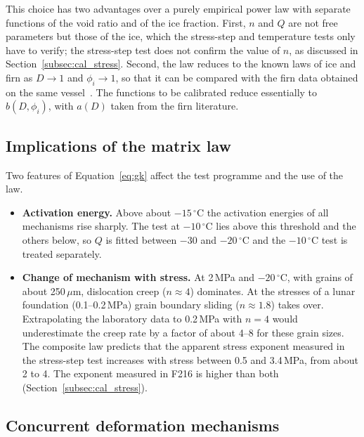 This choice has two advantages over a purely empirical power law with separate functions of the void ratio and of the ice fraction. First, $n$ and $Q$ are not free parameters but those of the ice, which the stress-step and temperature tests only have to verify; the stress-step test does not confirm the value of $n$, as discussed in Section~\ref{subsec:cal_stress}. Second, the law reduces to the known laws of ice and firn as $D\to1$ and $\phi_i\to1$, so that it can be compared with the firn data obtained on the same vessel~\cite{skarbek2025data}. The functions to be calibrated reduce essentially to $b(D,\phi_i)$, with $a(D)$ taken from the firn literature.

\subsection{Implications of the matrix law}

Two features of Equation~\eqref{eq:gk} affect the test programme and the use of the law.
\begin{itemize}
    \item \textbf{Activation energy.} Above about $-15\,^\circ$C the activation energies of all mechanisms rise sharply. The test at $-10\,^\circ$C lies above this threshold and the others below, so $Q$ is fitted between $-30$ and $-20\,^\circ$C and the $-10\,^\circ$C test is treated separately.
    \item \textbf{Change of mechanism with stress.} At 2\,MPa and $-20\,^\circ$C, with grains of about 250\,$\mu$m, dislocation creep ($n\approx4$) dominates. At the stresses of a lunar foundation (0.1--0.2\,MPa) grain boundary sliding ($n\approx1.8$) takes over. Extrapolating the laboratory data to 0.2\,MPa with $n = 4$ would underestimate the creep rate by a factor of about 4--8 for these grain sizes. The composite law predicts that the apparent stress exponent measured in the stress-step test increases with stress between 0.5 and 3.4\,MPa, from about 2 to 4. The exponent measured in F216 is higher than both (Section~\ref{subsec:cal_stress}).
\end{itemize}

\subsection{Concurrent deformation mechanisms}
\label{subsec:mechanisms}

